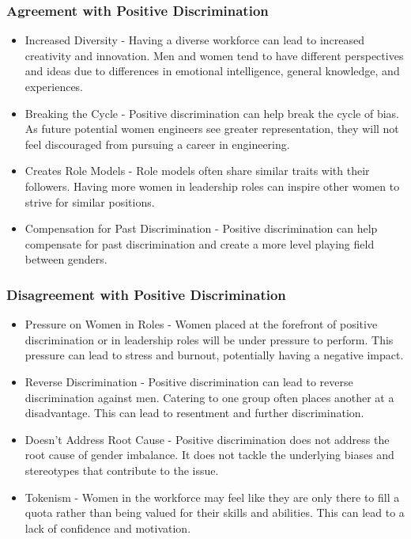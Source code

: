 \documentclass{article}
\begin{document}
\subsubsection{Agreement with Positive Discrimination}
\begin{itemize}
    \item Increased Diversity - Having a diverse workforce can lead to increased creativity and innovation. Men and women tend to have different perspectives and ideas due to differences in emotional intelligence, general knowledge, and experiences.
    \item Breaking the Cycle - Positive discrimination can help break the cycle of bias. As future potential women engineers see greater representation, they will not feel discouraged from pursuing a career in engineering.
    \item Creates Role Models - Role models often share similar traits with their followers. Having more women in leadership roles can inspire other women to strive for similar positions.
    \item Compensation for Past Discrimination - Positive discrimination can help compensate for past discrimination and create a more level playing field between genders.
\end{itemize}

\subsubsection{Disagreement with Positive Discrimination}
\begin{itemize}
    \item Pressure on Women in Roles - Women placed at the forefront of positive discrimination or in leadership roles will be under pressure to perform. This pressure can lead to stress and burnout, potentially having a negative impact.
    \item Reverse Discrimination - Positive discrimination can lead to reverse discrimination against men. Catering to one group often places another at a disadvantage. This can lead to resentment and further discrimination.
    \item Doesn't Address Root Cause - Positive discrimination does not address the root cause of gender imbalance. It does not tackle the underlying biases and stereotypes that contribute to the issue.
    \item Tokenism - Women in the workforce may feel like they are only there to fill a quota rather than being valued for their skills and abilities. This can lead to a lack of confidence and motivation.
\end{itemize}
\end{document}
